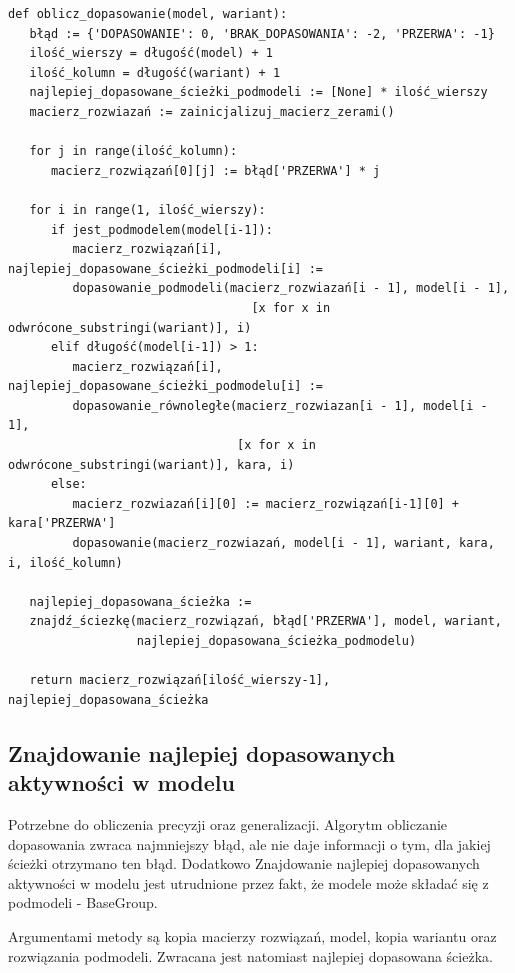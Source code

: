 \lstset{caption=Obliczanie dopasowania, captionpos=b}
\lstset{label=src:alignment_calculation, frame=single}
\begin{lstlisting}[escapeinside=``]
def oblicz_dopasowanie(model, wariant):
   błąd := {'DOPASOWANIE': 0, 'BRAK_DOPASOWANIA': -2, 'PRZERWA': -1}
   ilość_wierszy = długość(model) + 1
   ilość_kolumn = długość(wariant) + 1
   najlepiej_dopasowane_ścieżki_podmodeli := [None] * ilość_wierszy
   macierz_rozwiazań := zainicjalizuj_macierz_zerami()

   for j in range(ilość_kolumn):
      macierz_rozwiązań[0][j] := błąd['PRZERWA'] * j

   for i in range(1, ilość_wierszy):
      if jest_podmodelem(model[i-1]):
         macierz_rozwiązań[i], najlepiej_dopasowane_ścieżki_podmodeli[i] := 
         dopasowanie_podmodeli(macierz_rozwiazań[i - 1], model[i - 1],
                                  [x for x in odwrócone_substringi(wariant)], i)
      elif długość(model[i-1]) > 1:
         macierz_rozwiązań[i], najlepiej_dopasowane_ścieżki_podmodelu[i] := 
         dopasowanie_równoległe(macierz_rozwiazan[i - 1], model[i - 1],
                                [x for x in odwrócone_substringi(wariant)], kara, i)
      else:
         macierz_rozwiazań[i][0] := macierz_rozwiązań[i-1][0] + kara['PRZERWA']
         dopasowanie(macierz_rozwiazań, model[i - 1], wariant, kara, i, ilość_kolumn)

   najlepiej_dopasowana_ścieżka := 
   znajdź_ściezkę(macierz_rozwiązań, błąd['PRZERWA'], model, wariant, 
                  najlepiej_dopasowana_ścieżka_podmodelu)

   return macierz_rozwiązań[ilość_wierszy-1], najlepiej_dopasowana_ścieżka
\end{lstlisting}

\subsection{Znajdowanie najlepiej dopasowanych aktywności w modelu}
Potrzebne do obliczenia precyzji oraz generalizacji. Algorytm obliczanie dopasowania zwraca najmniejszy błąd, ale nie daje informacji o tym, dla jakiej ścieżki otrzymano ten błąd. Dodatkowo Znajdowanie najlepiej dopasowanych aktywności w modelu jest utrudnione przez fakt, że modele może składać się z podmodeli - BaseGroup. 

Argumentami metody są kopia macierzy rozwiązań, model, kopia wariantu oraz rozwiązania podmodeli. Zwracana jest natomiast najlepiej dopasowana ścieżka.

